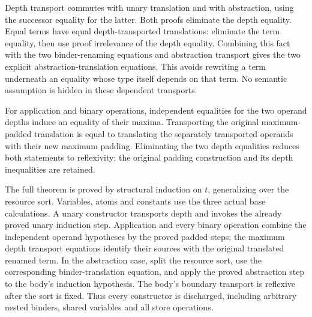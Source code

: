 Depth transport commutes with unary translation and with abstraction,
using the successor equality for the latter. Both proofs eliminate the depth
equality. Equal terms have equal depth-transported translations: eliminate
the term equality, then use proof irrelevance of the depth equality. Combining
this fact with the two binder-renaming equations and abstraction transport
gives the two explicit abstraction-translation equations. This avoids
rewriting a term underneath an equality whose type itself depends on that
term. No semantic assumption is hidden in these dependent transports.






For application and binary operations, independent equalities for the two
operand depths induce an equality of their maxima. Transporting the original
maximum-padded translation is equal to translating the separately transported
operands with their new maximum padding. Eliminating the two depth equalities
reduces both statements to reflexivity; the original padding construction and
its depth inequalities are retained.



The full theorem is proved by structural induction on $t$, generalizing over
the resource sort. Variables, atoms and constants use the three actual base
calculations. A unary constructor transports depth and invokes the already
proved unary induction step. Application and every binary operation combine
the independent operand hypotheses by the proved padded steps; the maximum
depth transport equations identify their sources with the original translated
renamed term. In the abstraction case, split the resource sort, use the
corresponding binder-translation equation, and apply the proved abstraction
step to the body's induction hypothesis. The body's boundary transport is
reflexive after the sort is fixed. Thus every constructor is discharged,
including arbitrary nested binders, shared variables and all store operations.

